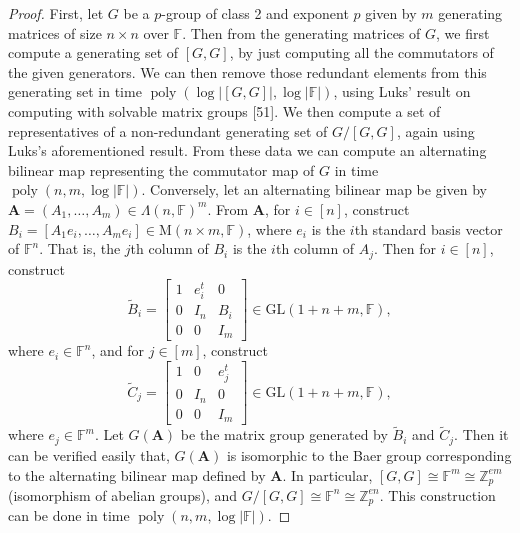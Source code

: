 \documentclass[10pt,a4paper]{article}
\begin{document}
\begin{proof}
First, let $G$ be a $p$-group of class 2 and exponent $p$ given by $m$ generating matrices of size $n\times n$ over $\mathbb F$. Then from the generating matrices of $G$, we first compute a generating set of $[G,G]$, by just computing all the commutators of the given generators. We can then remove those redundant elements from this generating set in time $\operatorname{poly}(\log|[G,G]|,\log|\mathbb F|)$, using Luks' result on computing with solvable matrix groups [51]. We then compute a set of representatives of a non-redundant generating set of $G/[G,G]$, again using Luks's aforementioned result. From these data we can compute an alternating bilinear map representing the commutator map of $G$ in time $\operatorname{poly}(n,m,\log|\mathbb F|)$.
Conversely, let an alternating bilinear map be given by $\mathbf A=(A_1,\ldots,A_m)\in\Lambda(n,\mathbb F)^m$. From $\mathbf A$, for $i\in[n]$, construct $B_i=[A_1e_i,\ldots,A_me_i]\in\mathrm M(n\times m,\mathbb F)$, where $e_i$ is the $i$th standard basis vector of $\mathbb F^n$. That is, the $j$th column of $B_i$ is the $i$th column of $A_j$. Then for $i\in[n]$, construct
\[\widetilde B_i=\begin{bmatrix}1&e_i^t&0\\0&I_n&B_i\\0&0&I_m\end{bmatrix}\in\mathrm{GL}(1+n+m,\mathbb F),\]
where $e_i\in\mathbb F^n$, and for $j\in[m]$, construct
\[\widetilde C_j=\begin{bmatrix}1&0&e_j^t\\0&I_n&0\\0&0&I_m\end{bmatrix}\in\mathrm{GL}(1+n+m,\mathbb F),\]
where $e_j\in\mathbb F^m$. Let $G(\mathbf A)$ be the matrix group generated by $\widetilde B_i$ and $\widetilde C_j$. Then it can be verified easily that, $G(\mathbf A)$ is isomorphic to the Baer group corresponding to the alternating bilinear map defined by $\mathbf A$. In particular, $[G,G]\cong\mathbb F^m\cong\mathbb Z_p^{em}$ (isomorphism of abelian groups), and $G/[G,G]\cong\mathbb F^n\cong\mathbb Z_p^{en}$. This construction can be done in time $\operatorname{poly}(n,m,\log|\mathbb F|)$.
\end{proof}
\end{document}

